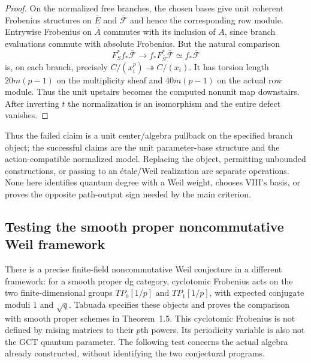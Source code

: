 \documentclass[11pt,a4paper]{article}
\renewcommand{\S}{\ensuremath{\mathsection}}
\theoremstyle{named}\newtheorem{finding}{Finding}[section]
\theoremstyle{definition}\newtheorem{definition}[finding]{Definition}
\theoremstyle{remark}\newtheorem{remark}[finding]{Remark}
\begin{document}
\begin{proof}
On the normalized free branches, the chosen bases give unit
coherent Frobenius structures on $\bar E$ and
$\bar{\mathcal F}$ and hence the corresponding row module.
Entrywise Frobenius on $\bar A$ commutes with its inclusion of
$A$, since branch evaluations commute with absolute Frobenius.
But the natural comparison
\[
 F_S^*f_*\bar{\mathcal F}
       \longrightarrow f_*F_{\bar S}^*\bar{\mathcal F}
       \simeq f_*\bar{\mathcal F}
\]
is, on each branch, precisely $C/(x_i^p)\twoheadrightarrow C/(x_i)$.
It has torsion length $20m(p-1)$ on the multiplicity sheaf and
$40m(p-1)$ on the actual row module. Thus the unit upstairs
becomes the computed nonunit map downstairs. After inverting $t$
the normalization is an isomorphism and the entire defect vanishes.
\end{proof}


Thus the failed claim is a unit center/algebra pullback on the
specified branch object; the successful claims are the unit
parameter-base structure and the action-compatible normalized model.
Replacing the object, permitting unbounded constructions, or passing
to an \'etale/Weil realization are separate operations. None here
identifies quantum degree with a Weil weight, chooses VIII's basis,
or proves the opposite path-output sign needed by the main criterion.

\subsection{Testing the smooth proper noncommutative Weil framework}
There is a precise finite-field noncommutative Weil conjecture in a
different framework: for a smooth proper dg category, cyclotomic
Frobenius acts on the two finite-dimensional groups $TP_0[1/p]$
and $TP_1[1/p]$, with expected conjugate moduli $1$ and $\sqrt q$.
Tabuada \cite[\S1, pp.~2--3; \S5.1, pp.~13--14; \S6.1,
pp.~15--16]{TabuadaWeil} specifies these objects and proves the
comparison with smooth proper schemes in Theorem~1.5.
This cyclotomic Frobenius is not defined by raising matrices to
their $p$th powers. Its periodicity variable is also not the GCT
quantum parameter. The following test concerns the actual algebra
already constructed, without identifying the two conjectural programs.
\end{document}
